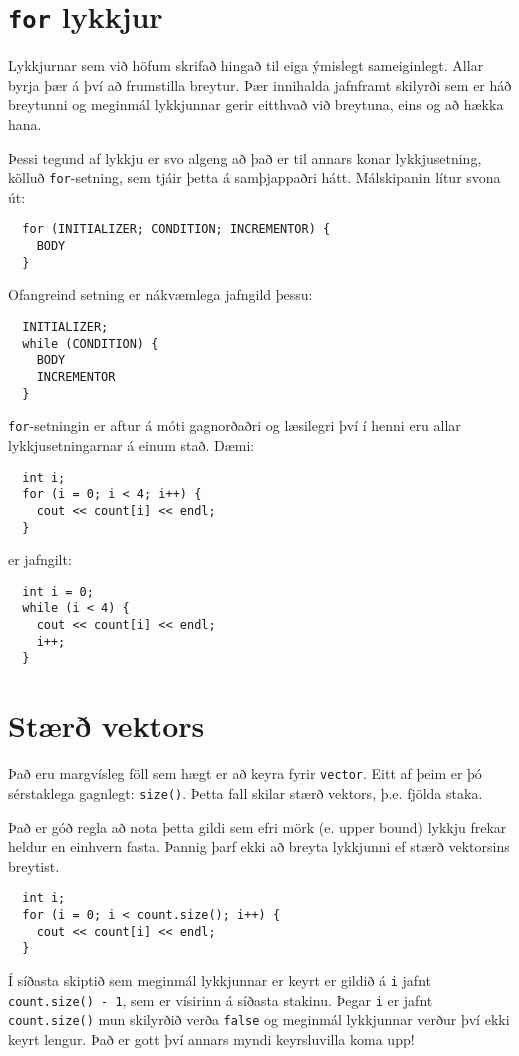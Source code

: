 \section{{\tt for} lykkjur}

Lykkjurnar sem við höfum skrifað hingað til eiga ýmislegt sameiginlegt.
Allar byrja þær á því að frumstilla breytur.
Þær innihalda jafnframt skilyrði sem er háð breytunni og meginmál lykkjunnar gerir eitthvað við breytuna, eins og að hækka hana. 


Þessi tegund af lykkju er svo algeng að það er til annars konar lykkjusetning, kölluð {\tt for}-setning, sem tjáir þetta á samþjappaðri hátt.
Málskipanin lítur svona út:

\begin{verbatim}
  for (INITIALIZER; CONDITION; INCREMENTOR) {
    BODY
  }
\end{verbatim}
%
Ofangreind setning er nákvæmlega jafngild þessu:

\begin{verbatim}
  INITIALIZER;
  while (CONDITION) {
    BODY
    INCREMENTOR
  }
\end{verbatim}
%
{\tt for}-setningin er aftur á móti gagnorðaðri og læsilegri því í henni eru allar lykkjusetningarnar á einum stað.
Dæmi:

\begin{verbatim}
  int i;
  for (i = 0; i < 4; i++) {
    cout << count[i] << endl;
  }
\end{verbatim}
%
er jafngilt:

\begin{verbatim}
  int i = 0;
  while (i < 4) {
    cout << count[i] << endl;
    i++;
  }
\end{verbatim}

\section{Stærð vektors}

Það eru margvísleg föll sem hægt er að keyra fyrir {\tt vector}.
Eitt af þeim er þó sérstaklega gagnlegt: {\tt size()}.
Þetta fall skilar stærð vektors, þ.e. fjölda staka.

Það er góð regla að nota þetta gildi sem efri mörk (e. upper bound) lykkju frekar heldur en einhvern fasta.
Þannig þarf ekki að breyta lykkjunni ef stærð vektorsins breytist.

\begin{verbatim}
  int i;
  for (i = 0; i < count.size(); i++) {
    cout << count[i] << endl;
  }
\end{verbatim}
%
Í síðasta skiptið sem meginmál lykkjunnar er keyrt er gildið á {\tt i} jafnt {\tt count.size() - 1}, sem er vísirinn á síðasta stakinu.
Þegar {\tt i} er jafnt {\tt count.size()} mun skilyrðið verða {\tt false} og meginmál lykkjunnar verður því ekki keyrt lengur.
Það er gott því annars myndi keyrsluvilla koma upp!

